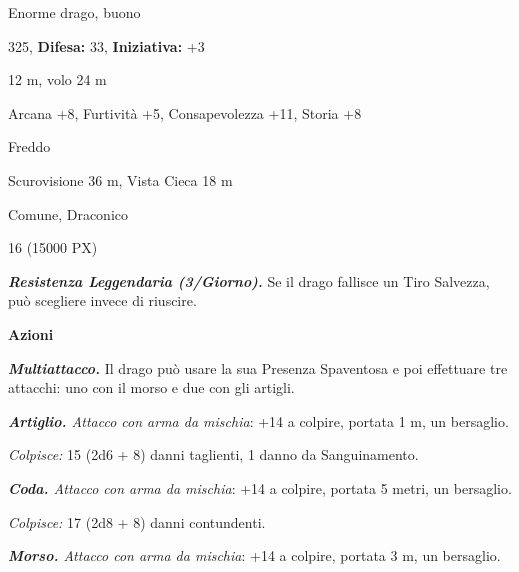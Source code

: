 \begin{multicols}{2}
{%
%

\noindent
\begin{description}[noitemsep, topsep=0pt, parsep=0pt, partopsep=0pt, leftmargin=0cm, labelwidth=2.2cm]
	\item[\textbf{Taglia/Tipo:}] Enorme drago, buono
	\item[\textbf{Caratt.:}] 
	\item[\textbf{Punti Ferita:}] 325,  \textbf{Difesa:} 33,  \textbf{Iniziativa:} +3
	\item[\textbf{Movimento:}] 12 m, volo 24 m
	\item[\textbf{Tiri Salvez.:}] 
	\item[\textbf{Comp.:}] Arcana +8, Furtività +5, Consapevolezza +11, Storia +8
	\item[\textbf{Imm. Danni:}] Freddo
	\item[\textbf{Sensi:}] Scurovisione 36 m, Vista Cieca 18 m
	\item[\textbf{Linguaggi:}] Comune, Draconico
	\item[\textbf{Sfida:}] 16 (15000 PX)\smallskip
\end{description}

\emph{\textbf{Resistenza Leggendaria (3/Giorno).}} Se il drago fallisce un Tiro Salvezza, può scegliere invece di riuscire.

\textbf{Azioni}

\emph{\textbf{Multiattacco.}} Il drago può usare la sua Presenza Spaventosa e poi effettuare tre attacchi: uno con il morso e due con gli artigli.

\emph{\textbf{Artiglio.} Attacco con arma da mischia}: +14 a colpire, portata 1 m, un bersaglio.

\emph{Colpisce:} 15 (2d6 + 8) danni taglienti, 1 danno da Sanguinamento.

\emph{\textbf{Coda.} Attacco con arma da mischia}: +14 a colpire, portata 5 metri, un bersaglio.

\emph{Colpisce:} 17 (2d8 + 8) danni contundenti.

\emph{\textbf{Morso.} Attacco con arma da mischia}: +14 a colpire, portata 3 m, un bersaglio.

}
\end{multicols}
